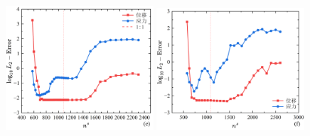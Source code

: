 \begin{figure}[!h]
\begin{subcaptiongroup}
    \label{Q4-l2-ns16}
    \end{subcaptiongroup}
    \begin{subcaptiongroup}
    \includegraphics[width=0.49\textwidth]{figures/shearlocking/T3-l2-ns32.png}
    \label{T3-l2-ns32}
    \includegraphics[width=0.49\textwidth]{figures/shearlocking/Q4-l2-ns32.png}
    \label{Q4-l2-ns32}
    \end{subcaptiongroup}
\caption{}
\label{ch_5:fig:linear_ns}
\end{figure}

